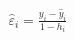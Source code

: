 \documentclass[10pt]{article}
\begin{document}
\begin{align*}\hat{\varepsilon}_i = \frac{y_i - \hat{y}_i}{1 - h_i}\end{align*}
\end{document}
